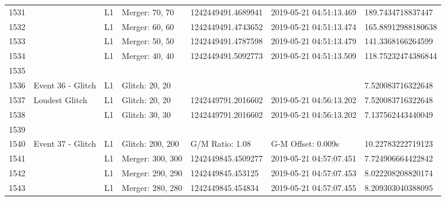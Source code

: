 \begin{longtable}{lllllll}
1531 &                                                    &       L1 &    Merger: 70, 70 &  1242449491.4689941 &  2019-05-21 04:51:13.469 &   189.7434718837447 \\
1532 &                                                    &       L1 &    Merger: 60, 60 &  1242449491.4743652 &  2019-05-21 04:51:13.474 &  165.88912988180638 \\
1533 &                                                    &       L1 &    Merger: 50, 50 &  1242449491.4787598 &  2019-05-21 04:51:13.479 &   141.3368166264599 \\
1534 &                                                    &       L1 &    Merger: 40, 40 &  1242449491.5092773 &  2019-05-21 04:51:13.509 &  118.75232474386844 \\
1535 &                                                    &          &                   &                     &                          &                     \\
1536 &                                  Event 36 - Glitch &       L1 &    Glitch: 20, 20 &                     &                          &   7.520083716322648 \\
1537 &                                     Loudest Glitch &       L1 &    Glitch: 20, 20 &  1242449791.2016602 &  2019-05-21 04:56:13.202 &   7.520083716322648 \\
1538 &                                                    &       L1 &    Glitch: 30, 30 &  1242449791.2016602 &  2019-05-21 04:56:13.202 &   7.137562443440049 \\
1539 &                                                    &          &                   &                     &                          &                     \\
1540 &                                  Event 37 - Glitch &       L1 &  Glitch: 200, 200 &     G/M Ratio: 1.08 &       G-M Offset: 0.009s &   10.22783222719123 \\
1541 &                                                    &       L1 &  Merger: 300, 300 &  1242449845.4509277 &  2019-05-21 04:57:07.451 &   7.724906664422842 \\
1542 &                                                    &       L1 &  Merger: 290, 290 &   1242449845.453125 &  2019-05-21 04:57:07.453 &   8.022208208820174 \\
1543 &                                                    &       L1 &  Merger: 280, 280 &   1242449845.454834 &  2019-05-21 04:57:07.455 &   8.209303040388095 \\

\end{longtable}
